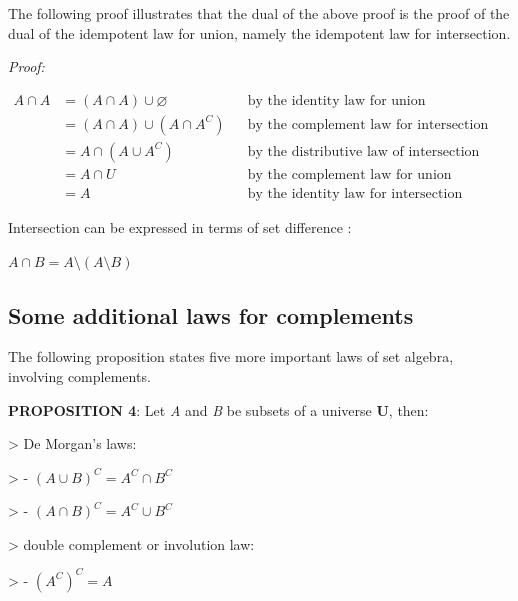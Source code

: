 The following proof illustrates that the dual of the above proof is the proof of the dual
of the idempotent law for union, namely the idempotent law for intersection.



\textit{Proof:}



\begin{align} A \cap A &= (A \cap A) \cup \varnothing && \text{by the identity law for union} \\ &= (A \cap A) \cup (A \cap A^C) && \text{by the complement law for intersection} \\ &= A \cap (A \cup A^C) && \text{by the distributive law of intersection over union} \\ &= A \cap U && \text{by the complement law for union} \\ &= A && \text{by the identity law for intersection} \end{align}



Intersection can be expressed in terms of set difference :



$A \cap B = A \setminus (A \setminus B)$




\subsection{Some additional laws for complements}
\label{sss:some-ea3c}




The following proposition states five more important laws of set algebra, involving complements.



\textbf{PROPOSITION 4}: Let \textit{A} and \textit{B} be subsets of a universe \textbf{U}, then:



> De Morgan's laws:

>    - $(A \cup B)^C = A^C \cap B^C$

>    - $(A \cap B)^C = A^C \cup B^C$



> double complement or involution law:

>    - ${(A^{C})}^{C} = A$



